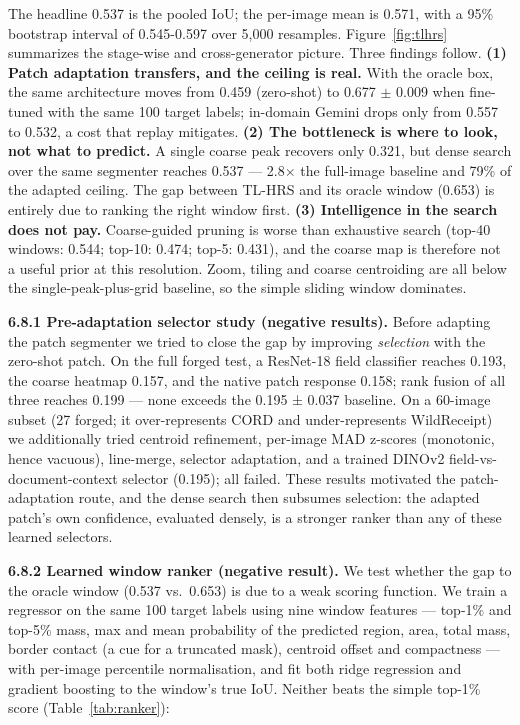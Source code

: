\documentclass[preprint,12pt]{elsarticle}
\begin{document}
The headline 0.537 is the pooled IoU; the per-image mean is 0.571, with a 95\% bootstrap interval of 0.545-0.597 over 5,000 resamples. Figure~\ref{fig:tlhrs} summarizes the stage-wise and cross-generator picture. Three findings follow. \textbf{(1) Patch adaptation transfers, and the ceiling is real.} With the oracle box, the same architecture moves from 0.459 (zero-shot) to 0.677 $\pm$ 0.009 when fine-tuned with the same 100 target labels; in-domain Gemini drops only from 0.557 to 0.532, a cost that replay mitigates. \textbf{(2) The bottleneck is where to look, not what to predict.} A single coarse peak recovers only 0.321, but dense search over the same segmenter reaches 0.537 --- 2.8$\times$ the full-image baseline and 79\% of the adapted ceiling. The gap between TL-HRS and its oracle window (0.653) is entirely due to ranking the right window first. \textbf{(3) Intelligence in the search does not pay.} Coarse-guided pruning is worse than exhaustive search (top-40 windows: 0.544; top-10: 0.474; top-5: 0.431), and the coarse map is therefore not a useful prior at this resolution. Zoom, tiling and coarse centroiding are all below the single-peak-plus-grid baseline, so the simple sliding window dominates.

\textbf{6.8.1 Pre-adaptation selector study (negative results).} Before adapting the patch segmenter we tried to close the gap by improving \emph{selection} with the zero-shot patch. On the full forged test, a ResNet-18 field classifier reaches 0.193, the coarse heatmap 0.157, and the native patch response 0.158; rank fusion of all three reaches 0.199 --- none exceeds the 0.195 ± 0.037 baseline. On a 60-image subset (27 forged; it over-represents CORD and under-represents WildReceipt) we additionally tried centroid refinement, per-image MAD z-scores (monotonic, hence vacuous), line-merge, selector adaptation, and a trained DINOv2 field-vs-document-context selector (0.195); all failed. These results motivated the patch-adaptation route, and the dense search then subsumes selection: the adapted patch's own confidence, evaluated densely, is a stronger ranker than any of these learned selectors.

\textbf{6.8.2 Learned window ranker (negative result).} We test whether the gap to the oracle window (0.537 vs.~0.653) is due to a weak scoring function. We train a regressor on the same 100 target labels using nine window features --- top-1\% and top-5\% mass, max and mean probability of the predicted region, area, total mass, border contact (a cue for a truncated mask), centroid offset and compactness --- with per-image percentile normalisation, and fit both ridge regression and gradient boosting to the window's true IoU. Neither beats the simple top-1\% score (Table~\ref{tab:ranker}):
\end{document}

